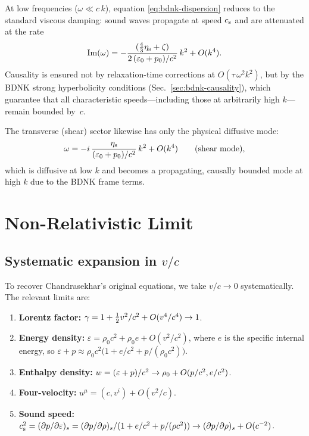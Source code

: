At low frequencies ($\omega \ll c\,k$), equation
\eqref{eq:bdnk-dispersion} reduces to the standard viscous damping:
sound waves propagate at speed $c_{\mathrm{s}}$ and are attenuated at the rate
\begin{equation}
  \mathrm{Im}(\omega)
    = -\frac{(\tfrac{4}{3}\shearvisc + \bulkvisc)}%
      {2\,(\varepsilon_0 + p_0)/c^2}\,k^2 + O(k^4).
  \label{eq:bdnk-damping-rate}
\end{equation}
Causality is ensured not by relaxation-time corrections at
$O(\tau\,\omega^2 k^2)$, but by the BDNK strong hyperbolicity
conditions (Sec.~\ref{sec:bdnk-causality}), which guarantee that all
characteristic speeds---including those at arbitrarily high $k$---remain bounded by~$c$.

The transverse (shear) sector likewise has only the physical
diffusive mode:
\begin{equation}
  \omega = -i\,\frac{\eta_{\mathrm{s}}}{(\varepsilon_0 + p_0)/c^2}\,k^2
    + O(k^4)
    \qquad\text{(shear mode)},
  \label{eq:bdnk-shear-mode}
\end{equation}
which is diffusive at low $k$ and becomes a propagating, causally
bounded mode at high $k$ due to the BDNK frame terms.


\section{Non-Relativistic Limit}
\label{sec:nr-limit}

\subsection{Systematic expansion in $v/c$}
\label{sec:vc-expansion}

To recover Chandrasekhar's original equations, we take
$v/c \to 0$ systematically.  The relevant limits are:

\begin{enumerate}
\item \textbf{Lorentz factor:} $\gamma = 1 + \tfrac{1}{2}v^2/c^2
  + O(v^4/c^4) \to 1$.

\item \textbf{Energy density:}
  $\varepsilon = \rho_0 c^2 + \rho_0 e + O(v^2/c^2)$,
  where $e$ is the specific internal energy, so
  $\varepsilon + p \approx \rho_0 c^2\bigl(1 + e/c^2 + p/(\rho_0 c^2)\bigr)$.

\item \textbf{Enthalpy density:}
  $w = (\varepsilon + p)/c^2 \to \rho_0
  + O(p/c^2, e/c^2)$.

\item \textbf{Four-velocity:}
  $u^{\mu} = (c, v^i) + O(v^2/c)$.

\item \textbf{Sound speed:}
  $c_{\mathrm{s}}^2 = (\partial p/\partial\varepsilon)_s
  = (\partial p/\partial\rho)_s / (1 + e/c^2 + p/(\rho c^2))
  \to (\partial p/\partial\rho)_s + O(c^{-2})$.
\end{enumerate}

